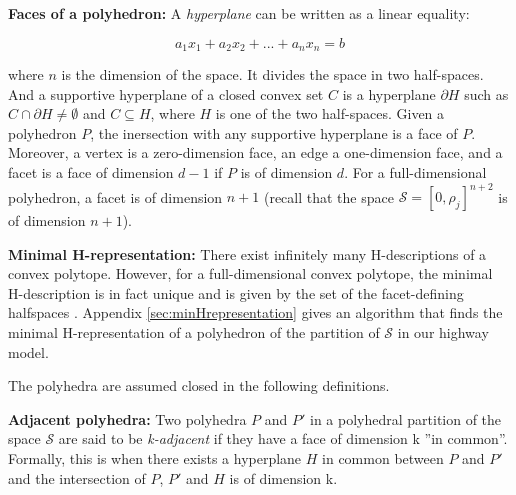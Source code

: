 \documentclass[11pt]{article}
\numberwithin{equation}{section}
\numberwithin{figure}{section}
\numberwithin{table}{section}
\begin{document}
\hspace{10mm}

\noindent \textbf{Faces of a polyhedron: }A \textit{hyperplane} can be written as a linear equality:

\begin{equation}
a_{1}x_{1} + a_{2}x_{2} + ... + a_{n}x_{n} = b
\label{eq:hyperplane}
\end{equation}

\noindent where $n$ is the dimension of the space. It divides the space in two half-spaces. And a supportive hyperplane of a closed convex set $C$ is a hyperplane $\partial H$ such as $C\cap\partial H\neq \emptyset$ and $C\subseteq H$, where $H$ is one  of the two half-spaces. Given a polyhedron $P$, the inersection with any supportive hyperplane is a face of $P$. Moreover, a vertex is a zero-dimension face, an edge a one-dimension face, and a facet is a face of dimension $d-1$ if $P$ is of dimension $d$. For a full-dimensional polyhedron, a facet is of dimension $n+1$ (recall that the space $\mathcal{S} = [0,\rho_{j}]^{n+2}$ is of dimension $n+1$).

\hspace{10mm}

\noindent \textbf{Minimal H-representation: }There exist infinitely many H-descriptions of a convex polytope. However, for a full-dimensional convex polytope, the minimal H-description is in fact unique and is given by the set of the facet-defining halfspaces \cite{Gruenbaum2003}. Appendix \ref{sec:minHrepresentation} gives an algorithm that finds the minimal H-representation of a polyhedron of the partition of $\mathcal{S}$ in our highway model.

\hspace{10mm}

\noindent The polyhedra are assumed closed in the following definitions.

\hspace{10mm}

\noindent \textbf{Adjacent polyhedra: } Two polyhedra $P$ and $P'$ in a polyhedral partition of the space $\mathcal{S}$ are said to be \textit{k-adjacent} if they have a face of dimension k ''in common''. Formally, this is when there exists a hyperplane $H$ in common between $P$ and $P'$ and the intersection of $P$, $P'$ and $H$ is of dimension k. 

\hspace{10mm}
\end{document}
